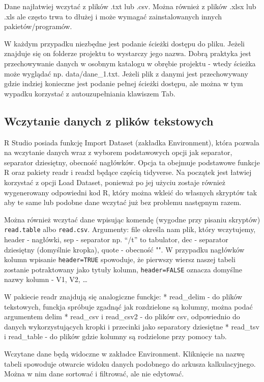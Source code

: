 \documentclass[
]{book}
\begin{document}
Dane najłatwiej wczytać z plików .txt lub .csv. Można również z plików .xlsx lub .xls ale często trwa to dłużej i może wymagać zainstalowanych innych pakietów/programów.

W każdym przypadku niezbędne jest podanie ścieżki dostępu do pliku. Jeżeli znajduje się on folderze projektu to wystarczy jego nazwa. Dobrą praktyka jest przechowywanie danych w osobnym katalogu w obrębie projektu - wtedy ścieżka może wyglądać np. data/dane\_1.txt. Jeżeli plik z danymi jest przechowywany gdzie indziej konieczne jest podanie pełnej ścieżki dostępu, ale można w tym wypadku korzystać z autouzupełniania klawiszem Tab.

\hypertarget{wczytanie-danych-z-plikuxf3w-tekstowych}{%
\subsection{Wczytanie danych z plików tekstowych}\label{wczytanie-danych-z-plikuxf3w-tekstowych}}

R Studio posiada funkcję Import Dataset (zakładka Environment), która pozwala na wczytanie danych wraz z wyborem podstawowych opcji jak separator, separator dziesiętny, obecność nagłówków. Opcja ta obejmuje podstawowe funkcje R oraz pakiety readr i readxl będące częścią tidyverse. Na początek jest łatwiej korzystać z opcji Load Dataset, ponieważ po jej użyciu zostaje również wygenerowany odpowiedni kod R, który można wkleić do własnych skryptów tak aby te same lub podobne dane wczytać już bez problemu następnym razem.

Można również wczytać dane wpisując komendę (wygodne przy pisaniu skryptów) \texttt{read.table} albo \texttt{read.csv}.
Argumenty: file określa nam plik, który wczytujemy, header - nagłówki, sep - separator np. ``/t'' to tabulator, dec - separator dziesiętny (domyślnie kropka), quote - obecność "". W przypadku nagłówków kolumn wpisanie \texttt{header=TRUE} spowoduje, że pierwszy wiersz naszej tabeli zostanie potraktowany jako tytuły kolumn, \texttt{header=FALSE} oznacza domyślne nazwy kolumn - V1, V2, \ldots{}

W pakiecie readr znajdują się analogiczne funckje:
* read\_delim - do plików tekstowych, funckja spróbuje zgadnąć jak rozdzielone są kolumny, można podać argumentem delim
* read\_csv i read\_csv2 - do plików csv, odpowiednio do danych wykorzystujących kropki i przecinki jako separatory dziesiętne
* read\_tsv i read\_table - do plików gdzie kolumny są rodzielone przy pomocy tab.

Wczytane dane będą widoczne w zakładce Environment. Kliknięcie na nazwę tabeli spowoduje otwarcie widoku danych podobnego do arkusza kalkulacyjnego. Można w nim dane sortować i filtrować, ale nie edytować.
\end{document}
